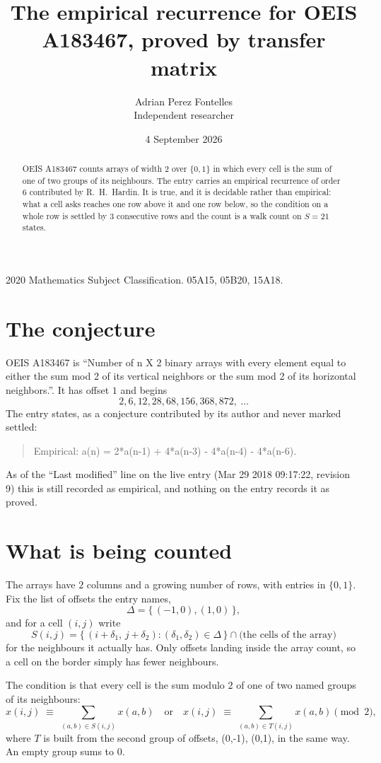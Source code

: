 \documentclass[11pt,a4paper]{article}
\title{The empirical recurrence for OEIS A183467, proved by transfer matrix}
\author{Adrian Perez Fontelles\\ \small Independent researcher}
\date{4 September 2026}
\theoremstyle{plain}
\theoremstyle{definition}
\begin{document}
\maketitle

\begin{abstract}
OEIS A183467 counts arrays of width $2$ over $\{0,1\}$ in which every cell is the sum of one of two groups of its neighbours. The entry carries an
empirical recurrence of order $6$ contributed by R.~H.~Hardin. It is true, and it is
decidable rather than empirical: what a cell asks reaches one row above
it and one row below, so the condition on a whole row is settled by
$3$ consecutive rows and the count is a walk count on $S=21$ states.
\end{abstract}

\noindent\small 2020 Mathematics Subject Classification. 05A15, 05B20, 15A18.\normalsize

\section{The conjecture}

OEIS A183467 is ``Number of n X 2 binary arrays with every element equal to either the sum mod 2 of its vertical neighbors or the sum mod 2 of its horizontal neighbors.''. It has offset $1$ and begins
\[
2, 6, 12, 28, 68, 156, 368, 872,\ \dots
\]
The entry states, as a conjecture contributed by its author and never marked settled:
\begin{quote}
Empirical: a(n) = 2*a(n-1) + 4*a(n-3) - 4*a(n-4) - 4*a(n-6).
\end{quote}
As of the ``Last modified'' line on the live entry (Mar 29 2018 09:17:22, revision 9) this is still
recorded as empirical, and nothing on the entry records it as proved.

\section{What is being counted}

The arrays have $2$ columns and a growing number of rows, with entries in $\{0,1\}$. Fix the
list of offsets the entry names,
\[
\Delta=\{\,(-1,0), (1,0)\,\},
\]
and for a cell $(i,j)$ write
\[
S(i,j)=\{\,(i+\delta_1,\,j+\delta_2) : (\delta_1,\delta_2)\in\Delta\,\}\cap
\text{(the cells of the array)}
\]
for the neighbours it actually has. Only offsets landing inside the array count, so a cell on
the border simply has fewer neighbours.

The condition is that every cell is the sum modulo $2$ of one of two named groups of its neighbours:
\[
x(i,j)\;\equiv\;\sum_{(a,b)\in S(i,j)}x(a,b) \quad\text{or}\quad x(i,j)\;\equiv\;\sum_{(a,b)\in T(i,j)}x(a,b) \pmod{2},
\]
where $T$ is built from the second group of offsets, (0,-1), (0,1), in the same way. An empty group sums to $0$.
\end{document}
